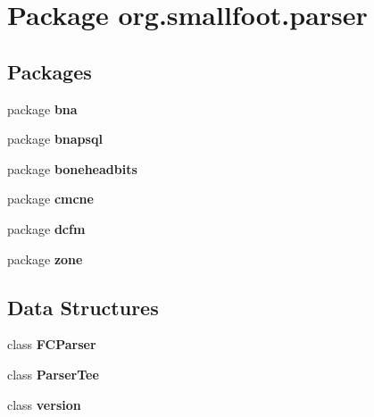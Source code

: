 \section{Package org.\+smallfoot.\+parser}
\label{namespaceorg_1_1smallfoot_1_1parser}
\subsection*{Packages}
\begin{DoxyCompactItemize}
\item 
package {\bf bna}
\item 
package {\bf bnapsql}
\item 
package {\bf boneheadbits}
\item 
package {\bf cmcne}
\item 
package {\bf dcfm}
\item 
package {\bf zone}
\end{DoxyCompactItemize}
\subsection*{Data Structures}
\begin{DoxyCompactItemize}
\item 
class {\bf F\+C\+Parser}
\item 
class {\bf Parser\+Tee}
\item 
class {\bf version}
\end{DoxyCompactItemize}
